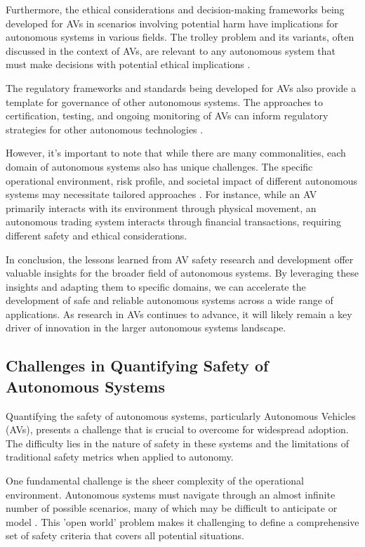 Furthermore, the ethical considerations and decision-making frameworks being developed for AVs in scenarios involving potential harm have implications for autonomous systems in various fields. The trolley problem and its variants, often discussed in the context of AVs, are relevant to any autonomous system that must make decisions with potential ethical implications \cite{Awad2018}.

The regulatory frameworks and standards being developed for AVs also provide a template for governance of other autonomous systems. The approaches to certification, testing, and ongoing monitoring of AVs can inform regulatory strategies for other autonomous technologies \cite{Cummings2021}.

However, it's important to note that while there are many commonalities, each domain of autonomous systems also has unique challenges. The specific operational environment, risk profile, and societal impact of different autonomous systems may necessitate tailored approaches \cite{Endsley2017}. For instance, while an AV primarily interacts with its environment through physical movement, an autonomous trading system interacts through financial transactions, requiring different safety and ethical considerations.

In conclusion, the lessons learned from AV safety research and development offer valuable insights for the broader field of autonomous systems. By leveraging these insights and adapting them to specific domains, we can accelerate the development of safe and reliable autonomous systems across a wide range of applications. As research in AVs continues to advance, it will likely remain a key driver of innovation in the larger autonomous systems landscape.

\subsection{Challenges in Quantifying Safety of Autonomous Systems}

Quantifying the safety of autonomous systems, particularly Autonomous Vehicles (AVs), presents a challenge that is crucial to overcome for widespread adoption. The difficulty lies in the nature of safety in these systems and the limitations of traditional safety metrics when applied to autonomy.

One fundamental challenge is the sheer complexity of the operational environment. Autonomous systems must navigate through an almost infinite number of possible scenarios, many of which may be difficult to anticipate or model \cite{Koopman2016}. This 'open world' problem makes it challenging to define a comprehensive set of safety criteria that covers all potential situations.

